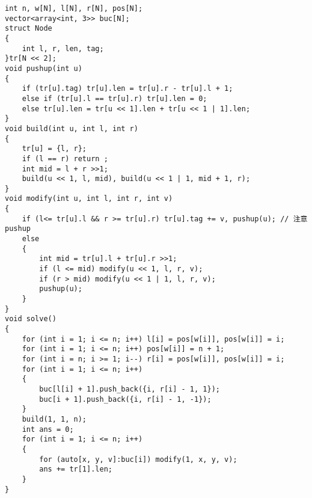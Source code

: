 \documentclass[a4paper, fontset=none]{ctexart}
\begin{document}
\begin{verbatim}
int n, w[N], l[N], r[N], pos[N];
vector<array<int, 3>> buc[N];
struct Node
{
    int l, r, len, tag;
}tr[N << 2];
void pushup(int u)
{
    if (tr[u].tag) tr[u].len = tr[u].r - tr[u].l + 1;
    else if (tr[u].l == tr[u].r) tr[u].len = 0;
    else tr[u].len = tr[u << 1].len + tr[u << 1 | 1].len;
}
void build(int u, int l, int r)
{
    tr[u] = {l, r};
    if (l == r) return ;
    int mid = l + r >>1;
    build(u << 1, l, mid), build(u << 1 | 1, mid + 1, r);
}
void modify(int u, int l, int r, int v)
{
    if (l<= tr[u].l && r >= tr[u].r) tr[u].tag += v, pushup(u); // 注意 pushup
    else
    {
        int mid = tr[u].l + tr[u].r >>1;
        if (l <= mid) modify(u << 1, l, r, v);
        if (r > mid) modify(u << 1 | 1, l, r, v);
        pushup(u);
    }
}
void solve()
{
    for (int i = 1; i <= n; i++) l[i] = pos[w[i]], pos[w[i]] = i;
    for (int i = 1; i <= n; i++) pos[w[i]] = n + 1;
    for (int i = n; i >= 1; i--) r[i] = pos[w[i]], pos[w[i]] = i;
    for (int i = 1; i <= n; i++)
    {
        buc[l[i] + 1].push_back({i, r[i] - 1, 1});
        buc[i + 1].push_back({i, r[i] - 1, -1});
    }
    build(1, 1, n);
    int ans = 0;
    for (int i = 1; i <= n; i++)
    {
        for (auto[x, y, v]:buc[i]) modify(1, x, y, v);
        ans += tr[1].len;
    }
}
\end{verbatim}
\end{document}
